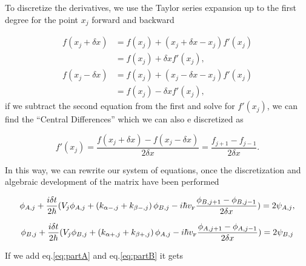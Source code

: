 To discretize the derivatives, we use the Taylor series expansion up to the first degree for the point $x_j$ forward and backward

\begin{align}
    \label{eq:TaylorBeforeAndAfter}
    f(x_j+\delta x)&=f(x_j) + (x_j+\delta x-x_j)f'(x_j)\nonumber\\
    &=f(x_j)+\delta xf'(x_j),\nonumber\\
    f(x_j-\delta x)&=f(x_j) + (x_j-\delta x-x_j)f'(x_j)\nonumber\\
    &=f(x_j)-\delta xf'(x_j),
\end{align}
\noindent if we subtract the second equation from the first and solve for $f'(x_j)$, we can find the ``Central Differences'' which we can also e discretized as

\begin{equation}
    \label{eq:diferenciasCentradas}
    f'(x_j)=\frac{f(x_j+\delta x)-f(x_j-\delta x)}{2\delta x} = \frac{f_{j+1}-f_{j-1}}{2\delta x}.
\end{equation}

In this way, we can rewrite our system of equations, once the discretization and algebraic development of the matrix have been performed

\begin{equation}
        \label{eq:partA}
    \phi_{A, j} + \frac{i\delta t}{2\hbar}(V_j\phi_{A,j} + \left(k_{\alpha-,j}+k_{\beta-,j}\right)\phi_{B,j}-
    i\hbar v_{\mbox{\tiny F}}\frac{\phi_{B, j+1}-\phi_{B, j-1}}{2\delta x}) = 2\psi_{A,j},
\end{equation}

\begin{equation}
    \label{eq:partB}
    \phi_{B, j} + \frac{i\delta t}{2\hbar}(V_j\phi_{B,j} + \left(k_{\alpha+,j}+k_{\beta+,j}\right)\phi_{A,j}-
    i\hbar v_{\mbox{\tiny F}}\frac{\phi_{A, j+1}-\phi_{A, j-1}}{2\delta x}) = 2\psi_{B,j}
\end{equation}

If we add eq.\eqref{eq:partA} and eq.\eqref{eq:partB} it gets

